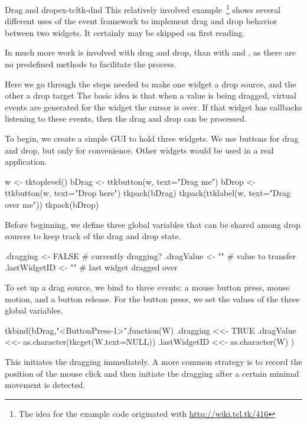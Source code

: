 \begin{example}{Drag and drop}{ex-tcltk-dnd}
This relatively involved example~\footnote{The idea for the example
  code originated with \url{http://wiki.tcl.tk/416}} shows several
different uses of the event framework to implement drag and drop
behavior between two widgets. It certainly may be skipped on first reading.


In  much more work is involved with drag and drop, than
with  and , as there are no predefined methods
to facilitate the process. 

Here we go through the steps needed to make one widget a drop source,
and the other a drop target The basic idea is that when a value is
being dragged, virtual events are generated for the widget the cursor
is over. If that widget has callbacks listening to these events, then the
drag and drop can be processed.


To begin, we create a simple GUI to hold three widgets. We use buttons
for drag and drop, but only for convenience. Other widgets would be
used in a real application.
\begin{Schunk}
\begin{Sinput}
 w <- tktoplevel()
 bDrag <- ttkbutton(w, text="Drag me")
 bDrop <- ttkbutton(w, text="Drop here")
 tkpack(bDrag)
 tkpack(ttklabel(w, text="Drag over me"))
 tkpack(bDrop)
\end{Sinput}
\end{Schunk}
%

Before beginning, we define three global variables that can be shared
among drop sources to keep track of the drag and drop state. 
\begin{Schunk}
\begin{Sinput}
 .dragging <- FALSE                 # currently dragging?
 .dragValue <- ""                   # value to transfer
 .lastWidgetID <- ""                # last widget dragged over
\end{Sinput}
\end{Schunk}
%
%
To set up a drag source, we bind to three events: a mouse button
press, mouse motion, and a button release. For the button press, we
set the values of the three global variables.
\begin{Schunk}
\begin{Sinput}
 tkbind(bDrag,"<ButtonPress-1>",function(W) {
   .dragging <<-  TRUE
   .dragValue <<- as.character(tkcget(W,text=NULL))
   .lastWidgetID <<- as.character(W)
 })
\end{Sinput}
\end{Schunk}
%
This initiates the dragging immediately. A more common strategy is to
record the position of the mouse click and then initiate the dragging
after a certain minimal movement is detected.


\end{example}
